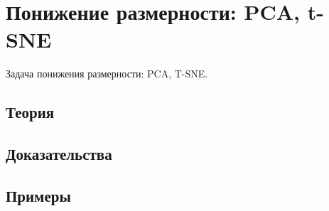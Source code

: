 
\section{Понижение размерности: PCA, t-SNE}
\label{sec:1.4.07-dim-reduction}

\begin{ticket}
Задача понижения размерности: PCA, T-SNE.
\end{ticket}

\subsection*{Теория}

\subsection*{Доказательства}

\subsection*{Примеры}
